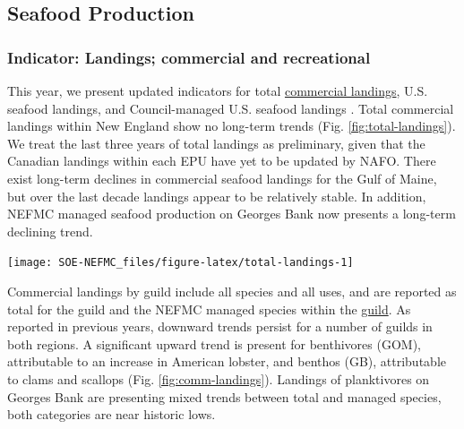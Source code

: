 \documentclass[
  10pt,
]{article}
\let\origfigure\figure
\let\endorigfigure\endfigure
\renewenvironment{figure}[1][2] {
    \expandafter\origfigure\expandafter[H]
} {
    \endorigfigure
}
\begin{document}
\hypertarget{seafood-production}{%
\subsection{Seafood Production}\label{seafood-production}}

\hypertarget{indicator-landings-commercial-and-recreational}{%
\subsubsection{Indicator: Landings; commercial and recreational}\label{indicator-landings-commercial-and-recreational}}

This year, we present updated indicators for total \href{https://noaa-edab.github.io/catalog/comdat.html}{commercial landings}, U.S. seafood landings, and Council-managed U.S. seafood landings . Total commercial landings within New England show no long-term trends (Fig. \ref{fig:total-landings}). We treat the last three years of total landings as preliminary, given that the Canadian landings within each EPU have yet to be updated by NAFO. There exist long-term declines in commercial seafood landings for the Gulf of Maine, but over the last decade landings appear to be relatively stable. In addition, NEFMC managed seafood production on Georges Bank now presents a long-term declining trend.

\begin{figure}

{\centering \texttt{[image: SOE-NEFMC\_files/figure-latex/total-landings-1]} 

}

\caption{Total commercial landings (black), total U.S. seafood landings (blue), and New England managed U.S. seafood landings (red) for Georges Bank (GB) and the Gulf of Maine (GOM). Open circles represent years that are lacking NAFO (foreign) data.}\label{fig:total-landings}
\end{figure}

Commercial landings by guild include all species and all uses, and are reported as total for the guild and the NEFMC managed species within the \href{https://noaa-edab.github.io/catalog/aggregate_biomass.html}{guild}. As reported in previous years, downward trends persist for a number of guilds in both regions. A significant upward trend is present for benthivores (GOM), attributable to an increase in American lobster, and benthos (GB), attributable to clams and scallops (Fig. \ref{fig:comm-landings}). Landings of planktivores on Georges Bank are presenting mixed trends between total and managed species, both categories are near historic lows.
\end{document}
